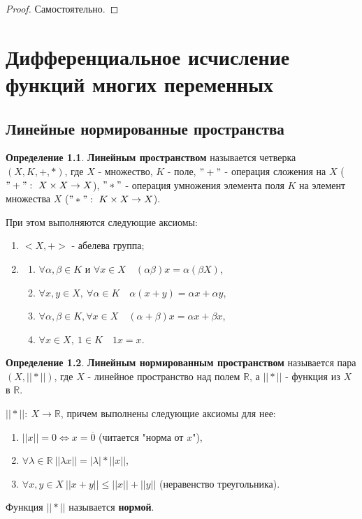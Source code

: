 \documentclass{report}
\theoremstyle{definition}
\newtheorem{definition}{Определение}[section]
\begin{document}
\begin{proof}
  Самостоятельно.
\end{proof}

\chapter{Дифференциальное исчисление функций многих переменных}

\section{Линейные нормированные пространства}

\begin{definition}
  \textbf{Линейным пространством} называется четверка $(X,K,+,*)$, где $X$ - множество, $K$ - поле, $"+"$ -
  операция сложения на $X$ ($"+": \ X \times X \rightarrow X$), $"*"$ - операция умножения элемента поля $K$
  на элемент множества $X$ ($"*": \ K \times X \rightarrow X$).

  При этом выполняются следующие аксиомы:
  \begin{enumerate}
    \item $<X,+>$ - абелева группа;
    \item
          \begin{enumerate}
            \item $\forall \alpha,\beta \in K$ и $\forall x \in X \quad (\alpha\beta)x = \alpha(\beta X)$,
            \item $\forall x,y \in X, \ \forall \alpha \in K \quad \alpha (x+y) = \alpha x + \alpha y$,
            \item $\forall \alpha,\beta \in K, \forall x \in X \quad (\alpha + \beta)x = \alpha x + \beta x$,
            \item $\forall x \in X, \ 1 \in K \quad 1x = x$.
          \end{enumerate}
  \end{enumerate}
\end{definition}

\begin{definition}
  \textbf{Линейным нормированным пространством} называется пара $(X,||*||)$, где $X$ - линейное пространство
  над полем $\mathbb{R}$, а $||*||$ - функция из $X$ в $\mathbb{R}$.

  $||*||: \ X \rightarrow \mathbb{R}$, причем выполнены следующие аксиомы для нее:
  \begin{enumerate}
    \item $||x|| = 0 \iff x = \overline{0}$ (читается "норма от $x$"),
    \item $\forall \lambda \in \mathbb{R} \ ||\lambda x|| = |\lambda| * ||x||$,
    \item $\forall x,y \in X \ ||x+y|| \leqslant ||x|| + ||y||$ (неравенство треугольника).
  \end{enumerate}
  Функция $||*||$ называется \textbf{нормой}.
\end{definition}
\end{document}
